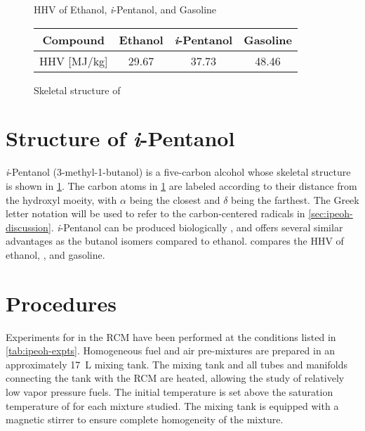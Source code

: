 \documentclass[../main.tex]{subfiles}
\begin{document}
\begin{figure}[!ht]\CenterFloatBoxes
    \begin{floatrow}
        \killfloatstyle\ttabbox
        {\captionsetup{type=table}\caption{HHV of Ethanol, \textit{i}-Pentanol, and Gasoline}
        \label{tab:ipeoh-heats}}
        {\begin{tabular}{*{4}{c}}
            \toprule
            Compound & Ethanol \cite{Afeefy2014} & \textit{i}-Pentanol \cite{Afeefy2014} & Gasoline \cite{Davis2013} \\
            \midrule
            HHV [\si[per-mode=symbol]{\mega\joule\per\kilo\gram}] & 29.67 & 37.73 & 48.46 \\
            \bottomrule
        \end{tabular}}
            {\caption{Skeletal structure of \iPeOH{}}
            \label{fig:ipeoh-skeletal}}
    \end{floatrow}
\end{figure}

\section{Structure of \textit{i}-Pentanol}
\label{sec:ipeoh-struct}

\textit{i}-Pentanol (3-methyl-1-butanol) is a five-carbon alcohol whose
skeletal structure is shown in \cref{fig:ipeoh-skeletal}. The carbon
atoms in \cref{fig:ipeoh-skeletal} are labeled according to their
distance from the hydroxyl moeity, with $\alpha$ being the closest and
$\delta$ being the farthest. The Greek letter notation will be used to
refer to the carbon-centered radicals in \cref{sec:ipeoh-discussion}.
\textit{i}-Pentanol can be produced biologically \cite{Peralta-Yahya2012},
and offers several similar advantages as the butanol isomers compared
to ethanol.  compares the HHV of ethanol, \iPeOH{},
and gasoline.

\section{Procedures}
\label{sec:ipeoh-procedure}

Experiments for \iPeOH{} in the RCM have been performed at the conditions listed
in \cref{tab:ipeoh-expts}. Homogeneous fuel and air pre-mixtures are prepared in an approximately
\SI{17}{\liter} mixing tank. The mixing tank and all tubes and manifolds
connecting the tank with the RCM are heated, allowing the study of
relatively low vapor pressure fuels. The initial temperature is set above
the saturation temperature of \iPeOH{} for each mixture studied. The mixing
tank is equipped with a magnetic stirrer to ensure complete homogeneity
of the mixture.
\end{document}
